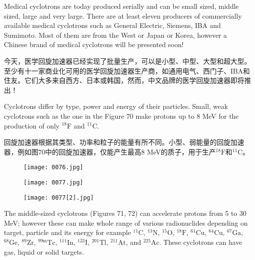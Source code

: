 \documentclass[dvipsnames, svgnames,a4paper,11pt]{article}
\begin{document}
Medical cyclotrons are today produced serially and can be small sized, middle sized, large and very large. There are at least eleven producers of commercially available medical cyclotrons such as General Electric, Siemens, IBA and Sumimoto. Most of them are from the West or Japan or Korea, however a Chinese brand of medical cyclotrons will be presented soon!

今天，医学回旋加速器已经实现了批量生产，可以是小型、中型、大型和超大型。至少有十一家商业化可用的医学回旋加速器生产商，如通用电气、西门子、IBA和住友。它们大多来自西方、日本或韩国，然而，中文品牌的医学回旋加速器即将推出！
 
Cyclotrons differ by type, power and energy of their particles. Small, weak cyclotrons such as the one in the Figure 70 make protons up to 8 MeV for the production of only $^{18}\text{F}$ and $^{11}\text{C}$.

回旋加速器根据其类型、功率和粒子的能量有所不同。小型、弱能量的回旋加速器，例如图70中的回旋加速器，仅能产生最高8 MeV的质子，用于生产$^{18}\text{F}$和$^{11}\text{C}$。

\begin{figure}[ht]
    \centering
    \texttt{[image: 0076.jpg]}
     \label{fig70}
\end{figure}

\begin{figure}[ht]
    \centering
    \texttt{[image: 0077.jpg]}
     \label{fig71}
\end{figure}

\begin{figure}[h]
    \centering
    \texttt{[image: 0077[2].jpg]}
     \label{fig72}
\end{figure}

The middle-sized cyclotrons (Figures 71, 72) can accelerate protons from 5 to 30 MeV; however these can make whole range of various radionuclides depending on target, particle and its energy for example $^{11}\text{C}$, $^{13}\text{N}$, $^{15}\text{O}$, $^{18}\text{F}$, $^{61}\text{Cu}$, $^{64}\text{Cu}$, $^{67}\text{Ga}$, $^{68}\text{Ge}$, $^{89}\text{Zr}$, $^{99\text{m}}\text{Tc}$, $^{111}\text{In}$, $^{123}\text{I}$, $^{201}\text{Tl}$, $^{211}\text{At}$, and $^{225}\text{Ac}$. These cyclotrons can have gas, liquid or solid targets.
\end{document}
